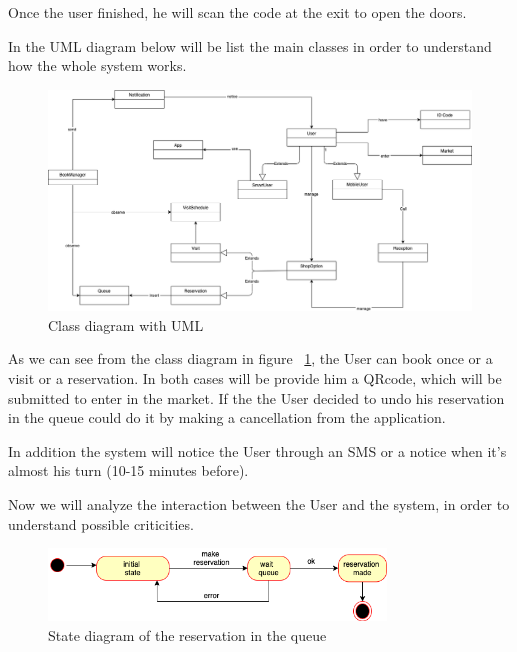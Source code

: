 Once the user finished, he will scan the code at the exit to open the doors.


\bigskip
In the UML diagram below will be list the main classes in order to understand how the whole system works.
\par 
\bigskip
\bigskip


\begin{figure}[h]
  \caption{Class diagram with UML}
  \label{fig:UML}
  \centering
  \includegraphics[scale=0.28]{diagrams/UML_simple.png}

\end{figure}
\par 
\medskip
As we can see from the class diagram in figure ~\ref{fig:UML}, the User can book once or a visit or a reservation.
In both cases will be provide him a QRcode, which will be submitted to enter in the market. 
If the the User decided to undo his reservation in the queue could do it by making a cancellation from the application. 
\par
\medskip
In addition the system will notice the User through an SMS or a notice when it's almost his turn (10-15 minutes before).

Now we will analyze the interaction between the User and the system, in order to understand possible criticities.
\par 
\bigskip

\begin{figure}[h]
  \caption{State diagram of the reservation in the queue}
  \label{fig:Reservation}
  \centering
  \includegraphics[width=0.8\textwidth, height=0.2\textwidth]{diagrams/2-reservation.png}

\end{figure}
\par 
\medskip


